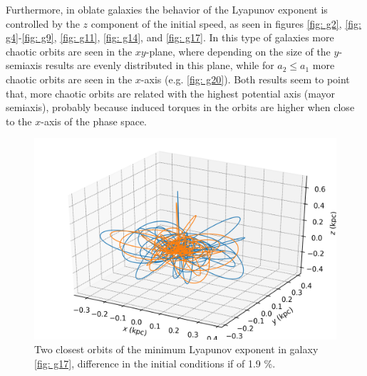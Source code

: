 	Furthermore, in oblate galaxies the behavior of the Lyapunov exponent is controlled by the $z$ component of the initial speed, as seen in figures \ref{fig: g2}, \ref{fig: g4}-\ref{fig: g9}, \ref{fig: g11}, \ref{fig: g14}, and \ref{fig: g17}. In this type of galaxies more chaotic orbits are seen in the $xy$-plane, where depending on the size of the $y$-semiaxis results are evenly distributed in this plane, while for $a_2 \leq a_1$ more chaotic orbits are seen in the $x$-axis (e.g. \autoref{fig: g20}). Both results seem to point that, more chaotic orbits are related with the highest potential axis (mayor semiaxis), probably because induced torques in the orbits are higher when close to the $x$-axis of the phase space.
	\begin{figure}[h]
		\centering
		\includegraphics[width = 0.7\linewidth]{"../Files/Week 14/lyapunov_orbits"}
		\caption{Two closest orbits of the minimum Lyapunov exponent in galaxy \ref{fig: g17}, difference in the initial conditions if of 1.9 \%.}
		\label{fig: lyapunov17}
	\end{figure}